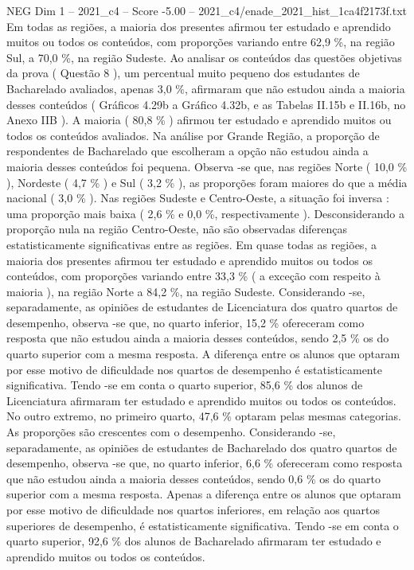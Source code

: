 \begin{textsample}{NEG Dim 1 – 2021\_c4 – Score -5.00 – 2021\_c4/enade\_2021\_hist\_1ca4f2173f.txt}
Em todas as regiões, a maioria dos presentes afirmou ter estudado e aprendido muitos ou todos os conteúdos, com proporções variando entre 62,9 \%, na região Sul, a 70,0 \%, na região Sudeste.
Ao analisar os conteúdos das questões objetivas da prova ( Questão 8 ), um percentual muito pequeno dos estudantes de Bacharelado avaliados, apenas 3,0 \%, afirmaram que não estudou ainda a maioria desses conteúdos ( Gráficos 4.29b a Gráfico 4.32b, e as Tabelas II.15b e II.16b, no Anexo IIB ).
A maioria ( 80,8 \% ) afirmou ter estudado e aprendido muitos ou todos os conteúdos avaliados.
Na análise por Grande Região, a proporção de respondentes de Bacharelado que escolheram a opção não estudou ainda a maioria desses conteúdos foi pequena.
Observa -se que, nas regiões Norte ( 10,0 \% ), Nordeste ( 4,7 \% ) e Sul ( 3,2 \% ), as proporções foram maiores do que a média nacional ( 3,0 \% ).
Nas regiões Sudeste e Centro-Oeste, a situação foi inversa : uma proporção mais baixa ( 2,6 \% e 0,0 \%, respectivamente ).
Desconsiderando a proporção nula na região Centro-Oeste, não são observadas diferenças estatisticamente significativas entre as regiões.
Em quase todas as regiões, a maioria dos presentes afirmou ter estudado e aprendido muitos ou todos os conteúdos, com proporções variando entre 33,3 \% ( a exceção com respeito à maioria ), na região Norte a 84,2 \%, na região Sudeste.
Considerando -se, separadamente, as opiniões de estudantes de Licenciatura dos quatro quartos de desempenho, observa -se que, no quarto inferior, 15,2 \% ofereceram como resposta que não estudou ainda a maioria desses conteúdos, sendo 2,5 \% os do quarto superior com a mesma resposta.
A diferença entre os alunos que optaram por esse motivo de dificuldade nos quartos de desempenho é estatisticamente significativa.
Tendo -se em conta o quarto superior, 85,6 \% dos alunos de Licenciatura afirmaram ter estudado e aprendido muitos ou todos os conteúdos.
No outro extremo, no primeiro quarto, 47,6 \% optaram pelas mesmas categorias.
As proporções são crescentes com o desempenho.
Considerando -se, separadamente, as opiniões de estudantes de Bacharelado dos quatro quartos de desempenho, observa -se que, no quarto inferior, 6,6 \% ofereceram como resposta que não estudou ainda a maioria desses conteúdos, sendo 0,6 \% os do quarto superior com a mesma resposta.
Apenas a diferença entre os alunos que optaram por esse motivo de dificuldade nos quartos inferiores, em relação aos quartos superiores de desempenho, é estatisticamente significativa.
Tendo -se em conta o quarto superior, 92,6 \% dos alunos de Bacharelado afirmaram ter estudado e aprendido muitos ou todos os conteúdos.

\end{textsample}
